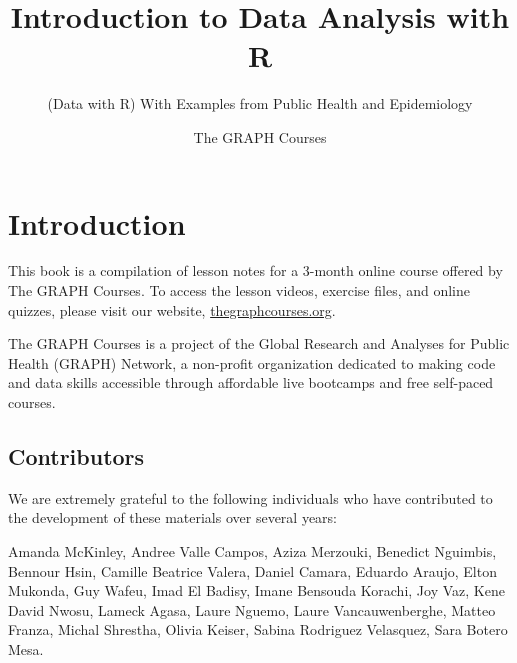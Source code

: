 \documentclass[
  letterpaper,
  DIV=11,
  numbers=noendperiod]{scrreprt}
\title{Introduction to Data Analysis with R}
\subtitle{(Data with R) With Examples from Public Health and
Epidemiology}
\author{The GRAPH Courses}
\date{}
\renewcommand*\contentsname{Table of contents}
\newcommand\contentsname{Table of contents}
\begin{document}
\maketitle
\pagestyle{mystyle}

\ifdefined\Shaded\renewenvironment{Shaded}{\begin{tcolorbox}[enhanced, frame hidden, boxrule=0pt, borderline west={3pt}{0pt}{shadecolor}, sharp corners, breakable, colback={codebgcolor}]}{\end{tcolorbox}}\fi

\renewcommand*\contentsname{Table of contents}
{
\hypersetup{linkcolor=}
\setcounter{tocdepth}{2}
\tableofcontents
}

\hypertarget{introduction}{%
\chapter*{Introduction}\label{introduction}}


This book is a compilation of lesson notes for a 3-month online course
offered by The GRAPH Courses. To access the lesson videos, exercise
files, and online quizzes, please visit our website,
\href{https://thegraphcourses.org}{thegraphcourses.org}.

The GRAPH Courses is a project of the Global Research and Analyses for
Public Health (GRAPH) Network, a non-profit organization dedicated to
making code and data skills accessible through affordable live bootcamps
and free self-paced courses.

\hypertarget{contributors}{%
\section*{Contributors}\label{contributors}}


We are extremely grateful to the following individuals who have
contributed to the development of these materials over several years:

Amanda McKinley, Andree Valle Campos, Aziza Merzouki, Benedict Nguimbis,
Bennour Hsin, Camille Beatrice Valera, Daniel Camara, Eduardo Araujo,
Elton Mukonda, Guy Wafeu, Imad El Badisy, Imane Bensouda Korachi, Joy
Vaz, Kene David Nwosu, Lameck Agasa, Laure Nguemo, Laure
Vancauwenberghe, Matteo Franza, Michal Shrestha, Olivia Keiser, Sabina
Rodriguez Velasquez, Sara Botero Mesa.
\end{document}
